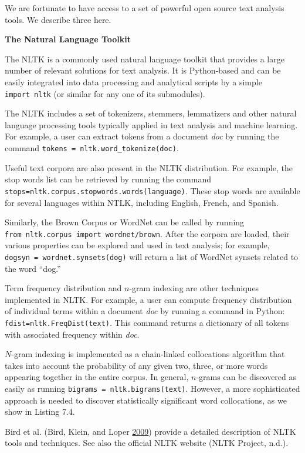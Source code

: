 \documentclass[]{krantz}
\begin{document}
We are fortunate to have access to a set of powerful open source text
analysis tools. We describe three here.

\textbf{The Natural Language Toolkit}

The NLTK is a commonly used natural language toolkit that provides a
large number of relevant solutions for text analysis. It is Python-based
and can be easily integrated into data processing and analytical scripts
by a simple \texttt{import\ nltk} (or similar for any one of its
submodules).

The NLTK includes a set of tokenizers, stemmers, lemmatizers and other
natural language processing tools typically applied in text analysis and
machine learning. For example, a user can extract tokens from a document
\emph{doc} by running the command
\texttt{tokens\ =\ nltk.word\_tokenize(doc)}.

Useful text corpora are also present in the NLTK distribution. For
example, the stop words list can be retrieved by running the command
\texttt{stops=nltk.corpus.stopwords.words(language)}. These stop words
are available for several languages within NTLK, including English,
French, and Spanish.

Similarly, the Brown Corpus or WordNet can be called by running
\texttt{from\ nltk.corpus\ import\ wordnet/brown}. After the corpora are
loaded, their various properties can be explored and used in text
analysis; for example,
\texttt{dogsyn\ =\ wordnet.synsets(\textquotesingle{}dog\textquotesingle{})}
will return a list of WordNet synsets related to the word ``dog.''

Term frequency distribution and \(n\)-gram indexing are other techniques
implemented in NLTK. For example, a user can compute frequency
distribution of individual terms within a document \emph{doc} by running
a command in Python: \texttt{fdist=nltk.FreqDist(text)}. This command
returns a dictionary of all tokens with associated frequency within
\emph{doc}.

\(N\)-gram indexing is implemented as a chain-linked collocations
algorithm that takes into account the probability of any given two,
three, or more words appearing together in the entire corpus. In
general, \(n\)-grams can be discovered as easily as running
\texttt{bigrams\ =\ nltk.bigrams(text)}. However, a more sophisticated
approach is needed to discover statistically significant word
collocations, as we show in Listing 7.4.

Bird et al. (Bird, Klein, and Loper
\protect\hyperlink{ref-bird-09}{2009}) provide a detailed description of
NLTK tools and techniques. See also the official NLTK website (NLTK
Project, n.d.).
\end{document}

